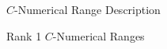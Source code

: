 \documentclass[12pt]{article}
\theoremstyle{plain}
\theoremstyle{definition}
\theoremstyle{remark}
\newtheorem{Lemma}[Theorem]{Lemma}
\numberwithin{equation}{section}
\begin{document}
\begin{section}{$C$-Numerical Range Description}
\begin{subsection}{Rank 1 $C$-Numerical Ranges}
\end{subsection}





    
\end{section}









    






\end{document}

